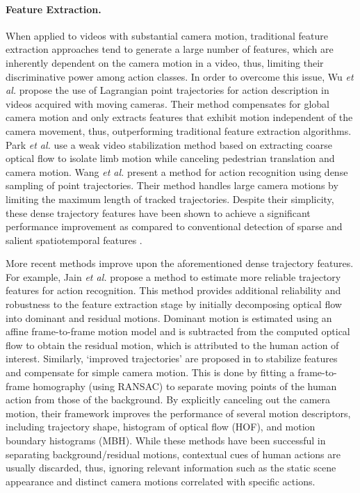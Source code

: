 \documentclass[runningheads]{llncs}
\begin{document}
\paragraph{\textbf{Feature Extraction.}} When applied to videos with substantial camera motion, traditional feature extraction approaches \cite{dollar2005, laptev2005} tend to generate a large number of features, which are inherently dependent on the camera motion in a video, thus, limiting their discriminative power among action classes. In order to overcome this issue, Wu \emph{et al.} \cite{wu2011} propose the use of Lagrangian point trajectories for action description in videos acquired with moving cameras. Their method compensates for global camera motion and only extracts features that exhibit motion independent of the camera movement, thus, outperforming traditional feature extraction algorithms. Park \emph{et al.} \cite{park2013} use a weak video stabilization method based on extracting coarse optical flow to isolate limb motion while canceling pedestrian translation and camera motion. Wang \emph{et al.} \cite{wang2011} present a method for action recognition using dense sampling of point trajectories. Their method handles large camera motions by limiting the maximum length of tracked trajectories. Despite their simplicity, these dense trajectory features have been shown to achieve a significant performance improvement as compared to conventional detection of sparse and salient spatiotemporal features \cite{laptev2005}.

More recent methods improve upon the aforementioned dense trajectory features. For example, Jain \emph{et al.} \cite{jain2013} propose a method to estimate more reliable trajectory features for action recognition. This method provides additional reliability and robustness to the feature extraction stage by initially decomposing optical flow into dominant and residual motions. Dominant motion is estimated using an affine frame-to-frame motion model and is subtracted from the computed optical flow to obtain the residual motion, which is attributed to the human action of interest. Similarly, `improved trajectories' are proposed in \cite{wang2013} to stabilize features and compensate for simple camera motion. This is done by fitting a frame-to-frame homography (using RANSAC) to separate moving points of the human action from those of the background. By explicitly canceling out the camera motion, their framework improves the performance of several motion descriptors, including trajectory shape, histogram of optical flow (HOF), and motion boundary histograms (MBH). While these methods have been successful in separating background/residual motions, contextual cues of human actions are usually discarded, thus, ignoring relevant information such as the static scene appearance and distinct camera motions correlated with specific actions.
\end{document}
